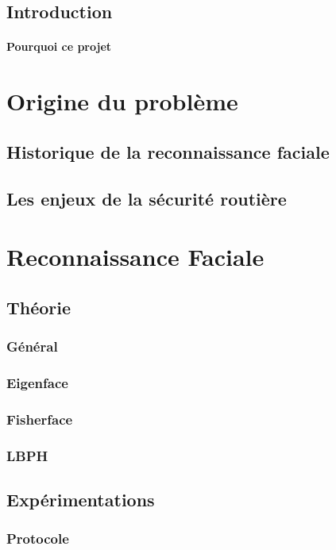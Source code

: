 \documentclass{report}
\begin{document}
\renewcommand{\chaptername}{Partie}
	\begin{abstract}
	\end{abstract}
	\chapter*{Introduction}
		\subsection{Pourquoi ce projet}
	\part{Origine du problème}
		\chapter{Historique de la reconnaissance faciale}
		\chapter{Les enjeux de la sécurité routière}
	\part{Reconnaissance Faciale}
		\chapter{Th\'eorie}
			\section{G\'en\'eral}
			\section{Eigenface}
			\section{Fisherface}
			\section{LBPH}
		\chapter{Exp\'erimentations}
			\section{Protocole}
\end{document}
